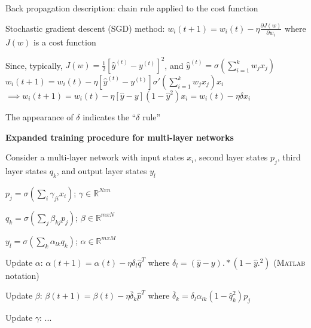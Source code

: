 \documentclass[letterpaper,fontsize=5pt]{scrartcl}
\renewenvironment{enumerate}[1]{\begin{compactenum}#1}{\end{compactenum}}
\theoremstyle{definition}
\newcommand{\RR}{\mathbb{R}}
\begin{document}
\begin{multicols}{2}
\begin{enumerate}
\begin{enumerate}
				\item Back propagation description: chain rule applied to the cost function
				\item Stochastic gradient descent (SGD) method: $w_i(t+1) = w_i(t) - \eta \frac{\partial J(w)}{\partial w_i}$ where $J(w)$ is a cost function
				\item Since, typically, $J(w) = \frac{1}{2}[\hat{y}^{(t)}-y^{(t)}]^2$, and $\hat{y}^{(t)} = \sigma(\sum\limits_{i=1}^k w_j x_j)$ \\ $w_i(t+1) = w_i(t) - \eta[\hat{y}^{(t)}-y^{(t)}] \sigma'(\sum\limits_{i=1}^k w_j x_j) x_i $ $ \implies w_i(t+1) = w_i(t) - \eta[\hat{y} - y](1-\hat{y}^2)x_i = w_i(t) - \eta \delta x_i$
				\item The appearance of $\delta$ indicates the ``$\delta$ rule''
			\end{enumerate}
		\item \textbf{Expanded training procedure for multi-layer networks}
			\begin{enumerate}
				\item Consider a multi-layer network with input states $x_i$, second layer states $p_j$, third layer states $q_k$, and output layer states $y_l$
					\begin{enumerate}
						\item $p_j = \sigma(\sum_i \gamma_{ji} x_i)$; $\gamma \in \RR^{Nxn}$
						\item $q_k = \sigma(\sum_j \beta_{kj} p_j)$; $\beta \in \RR^{mxN}$
						\item $y_l = \sigma(\sum_k \alpha_{lk} q_k)$; $\alpha \in \RR^{mxM}$
					\end{enumerate}
				\item Update $\alpha$: $\alpha(t+1) = \alpha(t) - \eta\delta_l \hat{q}^T$ where $\delta_l = (\hat{y} - y).*(1-\hat{y}.^2)$ (\textsc{Matlab} notation)\
				\item Update $\beta$: $\beta(t+1) = \beta(t) - \eta \bar{\delta}_k\hat{p}^T$ where $\bar{\delta}_k = \delta_l \alpha_{lk}(1-\hat{q}_k^2)p_j$
				\item Update $\gamma$: ...
			\end{enumerate}
	\end{enumerate}

\end{multicols}
\end{document}
